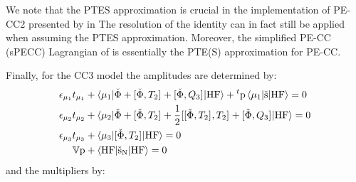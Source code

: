 We note that the \acrshort{PTES} approximation is crucial
in the implementation of \acrshort{PE}-\acrshort{CC2} presented by
\citeauthor{Schwabe2012-cf} in 
The resolution of the identity can in fact still be applied when
assuming the \acrshort{PTES} approximation.
Moreover, the simplified \acrshort{PE}-\acrshort{CC}
(s\acrshort*{PE}\acrshort*{CC}) Lagrangian of \citeauthor{Krause2016-ee}
is essentially the \acrshort{PTE(S)} approximation for
\acrshort{PE}-\acrshort{CC}.\autocite{Krause2016-ee}

Finally, for the \acrshort{CC3} model the amplitudes are determined by:
\begin{subequations}\label{eq:ptes-cc3-amplitudes}
  \begin{align}
    \epsilon_{\mu_1}t_{\mu_1} &+ \braket{\mu_1 |
    \check{\Phi} + [ \check{\Phi}, T_2 ]^{}
    + [ \check{\Phi}, Q_3 ]^{}
    | \mathrm{HF}}
    + {}^t\mathrm{p}\braket{\mu_1 | \check{\mathrm{s}} | \mathrm{HF}}
    = 0 \label{eq:ptes-cc3-singles-amplitudes} \\
    \epsilon_{\mu_2}t_{\mu_2} &+ \braket{\mu_2 |
    \check{\Phi} + [ \check{\Phi}, T_2 ]^{}
    + \frac{1}{2}[ [ \check{\Phi}, T_2 ]^{}, T_2 ]^{}
    + [ \check{\Phi}, Q_3 ]^{}
    | \mathrm{HF}}
    = 0 \label{eq:ptes-cc3-doubles-amplitudes} \\
    \epsilon_{\mu_3}t_{\mu_3} &+ \braket{\mu_3 |
    [ \check{\Phi}, T_2 ]^{}
    | \mathrm{HF}}
    = 0 \label{eq:ptes-cc3-triples-amplitudes} \\
    \mathbb{V}\mathrm{p} &+
    \braket{\mathrm{HF} | \check{\mathrm{s}}_{\mathrm{N}} | \mathrm{HF}} = 0
    \end{align}
\end{subequations}
and the multipliers by:
